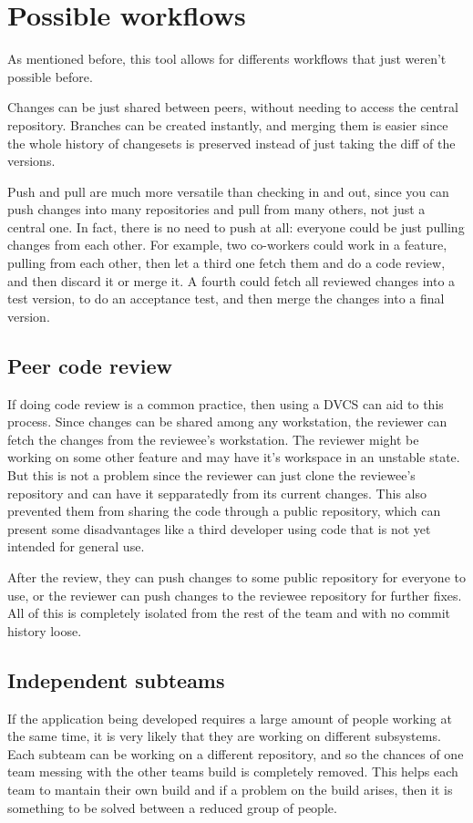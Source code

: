 \documentclass[%
	final,
	notitlepage,
	narroweqnarray,
	inline,
	twoside,
	]{ieee}
\begin{document}
\section{Possible workflows}

As mentioned before, this tool allows for differents workflows that just weren't 
possible before.

Changes can be just shared between peers, without needing to access the central 
repository. Branches can be created instantly, and merging them is easier since 
the whole history of changesets is preserved instead of just taking the diff of 
the versions.

Push and pull are much more versatile than checking in and out, since you can push 
changes into many repositories and pull from many others, not just a central one.
In fact, there is no need to push at all:
everyone could be just pulling changes from each other. For example, two co-workers could work 
in a feature, pulling from each other, then let a third one fetch them and do a code review, and then 
discard it or merge it. A fourth could fetch all reviewed changes into a test version, to do an 
acceptance test, and then merge the changes into a final version.

\subsection{Peer code review}
If doing code review is a common practice, then using a DVCS can aid to this process. Since changes can be shared
among any workstation, the reviewer can fetch the changes from the reviewee's workstation. The reviewer might be
working on some other feature and may have it's workspace in an unstable state. But this is not a problem since the
reviewer can just clone the reviewee's repository and can have it sepparatedly from its current changes.
This also prevented them from sharing the code through a public repository, which can present some disadvantages like
a third developer using code that is not yet intended for general use.

After the review, they can push changes to some public repository for everyone to use, or the reviewer can push changes to the reviewee repository for further fixes. All of this is completely isolated from the rest of the team and with no commit history loose.

\subsection{Independent subteams}
If the application being developed requires a large amount of people working at the same time, it is very likely that they are working on different subsystems. Each subteam can be working on a different repository, and so the chances of one team messing with the other teams build is completely removed. This helps each team to mantain their own build and if a problem on the build arises, then it is something to be solved between a reduced group of people.
\end{document}
